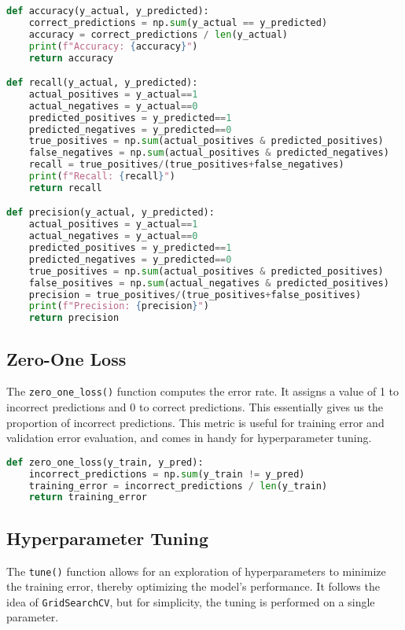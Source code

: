 \documentclass{article}
\begin{document}
\begin{lstlisting}[language=Python, caption=Evaluation Metrics]
def accuracy(y_actual, y_predicted):
    correct_predictions = np.sum(y_actual == y_predicted)
    accuracy = correct_predictions / len(y_actual)
    print(f"Accuracy: {accuracy}")
    return accuracy

def recall(y_actual, y_predicted):
    actual_positives = y_actual==1
    actual_negatives = y_actual==0
    predicted_positives = y_predicted==1
    predicted_negatives = y_predicted==0
    true_positives = np.sum(actual_positives & predicted_positives)
    false_negatives = np.sum(actual_positives & predicted_negatives)
    recall = true_positives/(true_positives+false_negatives)
    print(f"Recall: {recall}")
    return recall

def precision(y_actual, y_predicted):
    actual_positives = y_actual==1
    actual_negatives = y_actual==0
    predicted_positives = y_predicted==1
    predicted_negatives = y_predicted==0
    true_positives = np.sum(actual_positives & predicted_positives)
    false_positives = np.sum(actual_negatives & predicted_positives)
    precision = true_positives/(true_positives+false_positives)
    print(f"Precision: {precision}")
    return precision
\end{lstlisting}

\subsection{Zero-One Loss}
The \texttt{zero\_one\_loss()} function computes the error rate. It assigns a value of 1 to incorrect predictions and 0 to correct predictions. This essentially gives us the proportion of incorrect predictions.  This metric is useful for training error and validation error evaluation, and comes in handy for hyperparameter tuning.

\begin{lstlisting}[language=Python, caption=Zero-One Loss Calculation]
def zero_one_loss(y_train, y_pred):
    incorrect_predictions = np.sum(y_train != y_pred)
    training_error = incorrect_predictions / len(y_train)
    return training_error
\end{lstlisting}

\subsection{Hyperparameter Tuning}
The \texttt{tune()} function allows for an exploration of hyperparameters to minimize the training error, thereby optimizing the model's performance. It follows the idea of \texttt{GridSearchCV}, but for simplicity, the tuning is performed on a single parameter.
\end{document}
